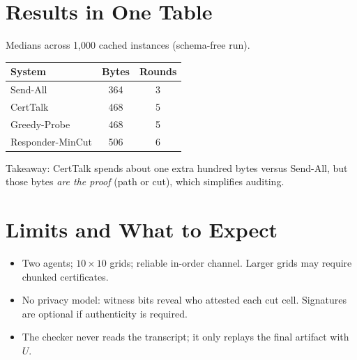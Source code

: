 \documentclass[11pt]{article}
\begin{document}
\section{Results in One Table}
Medians across 1{,}000 cached instances (schema-free run).
\begin{center}
\begin{tabular}{lcc}
\toprule
System & Bytes & Rounds \\
\midrule
Send-All & 364 & 3 \\
CertTalk & 468 & 5 \\
Greedy-Probe & 468 & 5 \\
Responder-MinCut & 506 & 6 \\
\bottomrule
\end{tabular}
\end{center}
\noindent Takeaway: CertTalk spends about one extra hundred bytes versus Send-All, but those bytes \emph{are the proof} (path or cut), which simplifies auditing.

\section{Limits and What to Expect}
\begin{itemize}
  \item Two agents; $10\times 10$ grids; reliable in-order channel. Larger grids may require chunked certificates.
  \item No privacy model: witness bits reveal who attested each cut cell. Signatures are optional if authenticity is required.
  \item The checker never reads the transcript; it only replays the final artifact with $U$.
\end{itemize}
\end{document}
